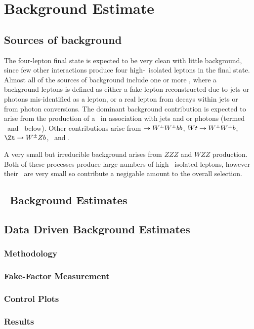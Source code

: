 \graphicspath{{Chapters/BackgroundEstimate/Figures/}}
\chapter{Background Estimate}
\label{chap:BackgroundEstimate}
\section{Sources of background}
The four-lepton final state is expected to be very clean with little
background, since few other interactions produce four high-\pt\ isolated leptons
in the final state. Almost all of the sources of background include one or more
, where a background
leptons is defined as either a fake-lepton reconstructed due to jets or
photons mis-identified as a lepton, or a real lepton from decays within jets or
from photon conversions.
The dominant background contribution is expected to arise from the production of a \Z\ in
association with jets and or photons (termed \Zjets\ and \Zgamma\ below). Other
contributions arise from \ttbar$\rightarrow W^{\pm}W^{\pm} bb$, $Wt\rightarrow W^{\pm}W^{\pm} b$, $\Zt\ra\W\Z b$,
\WW\ and \WZ.

A very small but irreducible background arises from $ZZZ$ and $WZZ$ production.
Both of these processes produce large numbers of high-\pt\ isolated leptons,
however their \cx\ are very small so contribute a negigable amount to the
overall selection.

\section{\mc\ Background Estimates}
\section{Data Driven Background Estimates}
\subsection{Methodology}
\subsection{Fake-Factor Measurement}
\subsection{Control Plots}
\subsection{Results}
